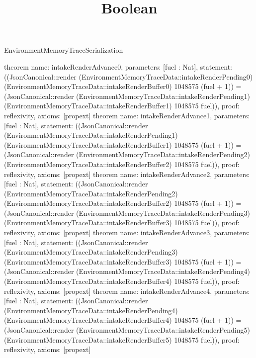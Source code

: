 \begin{lexlean}{EnvironmentMemoryTraceSerialization}
\title{Boolean}
\begin{semanticmodule}
theorem{
 name: intakeRenderAdvance0, parameters: [fuel : Nat],
 statement: ((JsonCanonical::render (EnvironmentMemoryTraceData::intakeRenderPending0) (EnvironmentMemoryTraceData::intakeRenderBuffer0) 1048575 (fuel + 1)) = (JsonCanonical::render (EnvironmentMemoryTraceData::intakeRenderPending1) (EnvironmentMemoryTraceData::intakeRenderBuffer1) 1048575 fuel)), proof: reflexivity{}, axioms: [propext]
}
theorem{
 name: intakeRenderAdvance1, parameters: [fuel : Nat],
 statement: ((JsonCanonical::render (EnvironmentMemoryTraceData::intakeRenderPending1) (EnvironmentMemoryTraceData::intakeRenderBuffer1) 1048575 (fuel + 1)) = (JsonCanonical::render (EnvironmentMemoryTraceData::intakeRenderPending2) (EnvironmentMemoryTraceData::intakeRenderBuffer2) 1048575 fuel)), proof: reflexivity{}, axioms: [propext]
}
theorem{
 name: intakeRenderAdvance2, parameters: [fuel : Nat],
 statement: ((JsonCanonical::render (EnvironmentMemoryTraceData::intakeRenderPending2) (EnvironmentMemoryTraceData::intakeRenderBuffer2) 1048575 (fuel + 1)) = (JsonCanonical::render (EnvironmentMemoryTraceData::intakeRenderPending3) (EnvironmentMemoryTraceData::intakeRenderBuffer3) 1048575 fuel)), proof: reflexivity{}, axioms: [propext]
}
theorem{
 name: intakeRenderAdvance3, parameters: [fuel : Nat],
 statement: ((JsonCanonical::render (EnvironmentMemoryTraceData::intakeRenderPending3) (EnvironmentMemoryTraceData::intakeRenderBuffer3) 1048575 (fuel + 1)) = (JsonCanonical::render (EnvironmentMemoryTraceData::intakeRenderPending4) (EnvironmentMemoryTraceData::intakeRenderBuffer4) 1048575 fuel)), proof: reflexivity{}, axioms: [propext]
}
theorem{
 name: intakeRenderAdvance4, parameters: [fuel : Nat],
 statement: ((JsonCanonical::render (EnvironmentMemoryTraceData::intakeRenderPending4) (EnvironmentMemoryTraceData::intakeRenderBuffer4) 1048575 (fuel + 1)) = (JsonCanonical::render (EnvironmentMemoryTraceData::intakeRenderPending5) (EnvironmentMemoryTraceData::intakeRenderBuffer5) 1048575 fuel)), proof: reflexivity{}, axioms: [propext]
}
\end{semanticmodule}
\end{lexlean}
